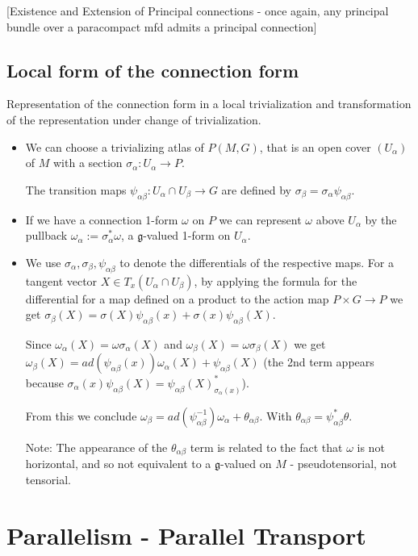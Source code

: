 \documentclass{report}
\theoremstyle{definition}
\begin{document}
[Existence and Extension of Principal connections - once again, any principal bundle over a paracompact mfd admits a principal connection]

\subsection{Local form of the connection form}

Representation of the connection form in a local trivialization and transformation of the representation under change of trivialization.
\begin{itemize}
    \item We can choose a trivializing atlas of $P(M,G)$, that is an open cover $(U_\alpha)$ of $M$ with a section $\sigma_\alpha:U_\alpha\to P$.

    The transition maps $\psi_{\alpha\beta}:U_\alpha\cap U_\beta\to G$ are defined by $\sigma_\beta=\sigma_\alpha\psi_{\alpha\beta}$.
    \item If we have a connection 1-form $\omega$ on $P$ we can represent $\omega$ above $U_\alpha$ by the pullback $\omega_\alpha:=\sigma^*_\alpha\omega$, a $\mathfrak{g}$-valued 1-form on $U_\alpha$.
    \item We use $\sigma_\alpha,\sigma_\beta,\psi_{\alpha\beta}$ to denote the differentials of the respective maps. For a tangent vector $X\in T_x(U_\alpha\cap U_\beta)$, by applying the formula for the differential for a map defined on a product to the action map $P\times G\to P$ we get $\sigma_\beta(X)=\sigma(X)\psi_{\alpha\beta}(x)+\sigma(x)\psi_{\alpha\beta}(X)$.

    Since $\omega_\alpha(X)=\omega\sigma_\alpha(X)$ and $\omega_\beta(X)=\omega\sigma_\beta(X)$ we get $\omega_\beta(X)=ad(\psi_{\alpha\beta}(x))\omega_\alpha(X)+\psi_{\alpha\beta}(X)$ (the 2nd term appears because $\sigma_\alpha(x)\psi_{\alpha\beta}(X)=\psi_{\alpha\beta}(X)^*_{\sigma_\alpha(x)}$).

    From this we conclude $\omega_\beta=ad(\psi_{\alpha\beta}^{-1})\omega_\alpha+\theta_{\alpha\beta}$. With $\theta_{\alpha\beta}=\psi_{\alpha\beta}^*\theta$.

    Note: The appearance of the $\theta_{\alpha\beta}$ term is related to the fact that $\omega$ is not horizontal, and so not equivalent to a $\mathfrak{g}$-valued on $M$ - pseudotensorial, not tensorial.
\end{itemize}

\section{Parallelism - Parallel Transport}
\end{document}
